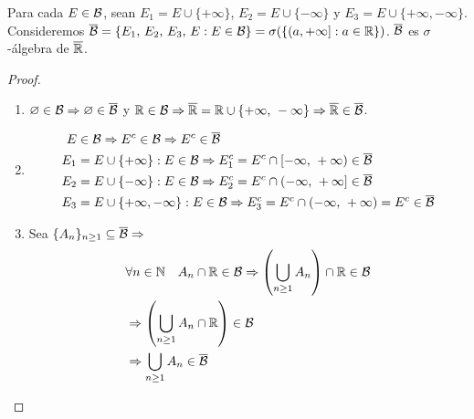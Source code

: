 \begin{definition}
    Para cada \(E \in \mathcal{B}\), sean \(E_1 = E \cup \{ + \infty \}\), \(E_2 = E \cup \{ - \infty \}\) y \(E_3 = E \cup \{ + \infty, - \infty \}\).
    Consideremos \(\overline{\mathcal{B}} = \{ E_1 \text{, } E_2 \text{, } E_3 \text{, } E : E \in \mathcal{B} \} = \sigma(\{ (a, +\infty] : a \in \mathbb{R} \})\).
    \(\overline{\mathcal{B}}\) es \(\sigma\)-álgebra de \(\overline{\mathbb{R}}\).

    \begin{proof}
        \begin{enumerate}
            \item \(\varnothing \in \mathcal{B} \Rightarrow \varnothing \in \overline{\mathcal{B}}\) y \(\mathbb{R} \in \mathcal{B} \Rightarrow \overline{\mathbb{R}} = \mathbb{R} \cup \{ +\infty \text{, } -\infty \} \Rightarrow \overline{\mathbb{R}} \in \overline{\mathcal{B}}\).
            \item \begin{align*}
                      E   & \in \mathcal{B} \Rightarrow E^c \in \mathcal{B} \Rightarrow E^c \in \overline{\mathcal{B}}                                                          \\
                      E_1 & = E \cup \{ +\infty \} : E \in \mathcal{B} \Rightarrow E_1^c = E^c \cap [-\infty \text{, } + \infty) \in \overline{\mathcal{B}}                \\
                      E_2 & = E \cup \{ -\infty \} : E \in \mathcal{B} \Rightarrow E_2^c = E^c \cap (-\infty \text{, } + \infty] \in \overline{\mathcal{B}}                \\
                      E_3 & = E \cup \{ +\infty, -\infty \} : E \in \mathcal{B} \Rightarrow E_3^c = E^c \cap (-\infty \text{, } + \infty) = E^c \in \overline{\mathcal{B}}
                  \end{align*}
            \item Sea \(\{ A_n \}_{n \geq 1} \subseteq \overline{\mathcal{B}} \Rightarrow\) \begin{align*}
                       & \forall n \in \mathbb{N} \quad A_n \cap \mathbb{R} \in \mathcal{B} \Rightarrow \left( \bigcup_{n \geq 1} A_n \right) \cap \mathbb{R} \in \mathcal{B} \\
                       & \Rightarrow \left( \bigcup_{n \geq 1} A_n \cap \mathbb{R} \right) \in \mathcal{B}                                               \\
                       & \Rightarrow \bigcup_{n \geq 1} A_n \in \overline{\mathcal{B}}
                  \end{align*}
        \end{enumerate}
    \end{proof}
\end{definition}